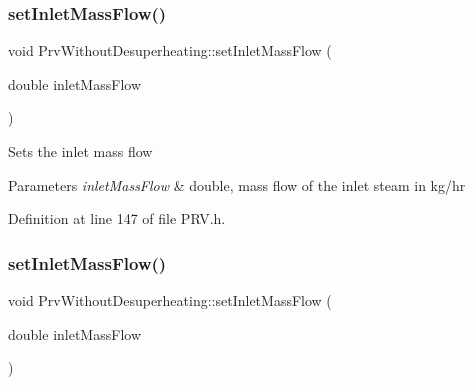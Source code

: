 \mbox{\label{class_prv_without_desuperheating_abeccff2dc91144452b34ca343ee63fa7}} 
\subsubsection{\texorpdfstring{set\+Inlet\+Mass\+Flow()}{setInletMassFlow()}\hspace{0.1cm}{\footnotesize\ttfamily [2/3]}}
{\footnotesize\ttfamily void Prv\+Without\+Desuperheating\+::set\+Inlet\+Mass\+Flow (\begin{DoxyParamCaption}\item[{double}]{inlet\+Mass\+Flow }\end{DoxyParamCaption})\hspace{0.3cm}{\ttfamily [inline]}}

Sets the inlet mass flow


\begin{DoxyParams}{Parameters}
{\em inlet\+Mass\+Flow} & double, mass flow of the inlet steam in kg/hr \\
\hline
\end{DoxyParams}


Definition at line 147 of file P\+R\+V.\+h.

\mbox{\label{class_prv_without_desuperheating_abeccff2dc91144452b34ca343ee63fa7}} 
\subsubsection{\texorpdfstring{set\+Inlet\+Mass\+Flow()}{setInletMassFlow()}\hspace{0.1cm}{\footnotesize\ttfamily [3/3]}}
{\footnotesize\ttfamily void Prv\+Without\+Desuperheating\+::set\+Inlet\+Mass\+Flow (\begin{DoxyParamCaption}\item[{double}]{inlet\+Mass\+Flow }\end{DoxyParamCaption})\hspace{0.3cm}{\ttfamily [inline]}}

